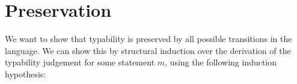 \documentclass[a4paper]{article}
\theoremstyle{dotless}
\begin{document}
\section*{Preservation}

We want to show that typability is preserved by all possible transitions
in the language. We can show this by structural induction over the
derivation of the typability judgement for some statement $m$, using the
following induction hypothesis:
\end{document}
